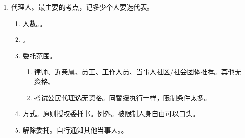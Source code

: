 \begin{enumerate}
\begin{enumerate}
\begin{enumerate}
                  \item 追加共同原告。基于同一个法律事实关系，利益一致（判决预决效力，结果上的）的利害关系人。看是否同意。
                        。。
                        \begin{enumerate}
                          \item 通知 + 同意 = 追加为共同原告。。
                          \item 通知 + 不同意 + 不弃权/肯弃权 = 应追加为第三人/不追加（啥也不做）。。
                        \end{enumerate}
                  \item vs 直接追加为第三人。为第三人。。
                \end{enumerate}
          \item 代理人。最主要的考点，记多少个人要选代表。
                \begin{enumerate}
                  \item 人数。。
                  \item {}。
                  \item 委托范围。
                        \begin{enumerate}
                          \item 律师、近亲属、员工、工作人员、当事人社区/社会团体推荐。其他无资格。
                          \item 考试公民代理选无资格。同暂缓执行一样，限制条件太多。
                        \end{enumerate}
                  \item 方式。原则授权委托书。例外。被限制人身自由可以口头。
                  \item 解除委托。自行通知其他当事人。。
                \end{enumerate}
        \end{enumerate}
\end{enumerate}
